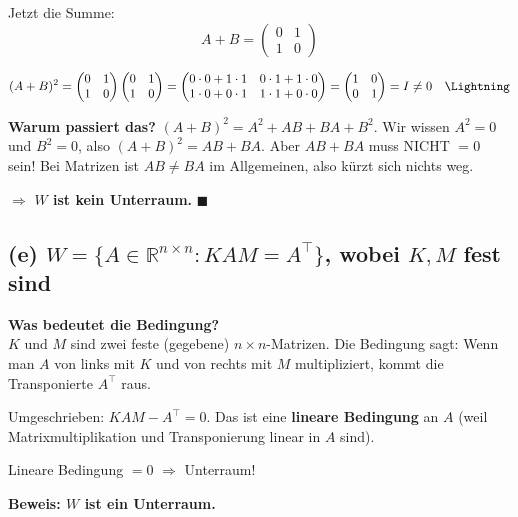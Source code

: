 \documentclass[a4paper,12pt]{article}
\begin{document}
Jetzt die Summe:
\[
A + B = \begin{pmatrix} 0 & 1 \\ 1 & 0 \end{pmatrix}
\]

\[
(A + B)^2 = \begin{pmatrix} 0 & 1 \\ 1 & 0 \end{pmatrix} \begin{pmatrix} 0 & 1 \\ 1 & 0 \end{pmatrix} = \begin{pmatrix} 0 \cdot 0 + 1 \cdot 1 & 0 \cdot 1 + 1 \cdot 0 \\ 1 \cdot 0 + 0 \cdot 1 & 1 \cdot 1 + 0 \cdot 0 \end{pmatrix} = \begin{pmatrix} 1 & 0 \\ 0 & 1 \end{pmatrix} = I \neq 0 \quad \Lightning
\]

\textbf{Warum passiert das?} $(A+B)^2 = A^2 + AB + BA + B^2$. Wir wissen $A^2 = 0$ und $B^2 = 0$, also $(A+B)^2 = AB + BA$. Aber $AB + BA$ muss NICHT $= 0$ sein! Bei Matrizen ist $AB \neq BA$ im Allgemeinen, also k\"urzt sich nichts weg.

$\Rightarrow$ \textbf{$W$ ist kein Unterraum.} \hfill $\blacksquare$

\subsection*{(e) \quad $W = \{A \in \mathbb{R}^{n \times n} : KAM = A^\top\}$, wobei $K, M$ fest sind}

\textbf{Was bedeutet die Bedingung?}\\
$K$ und $M$ sind zwei feste (gegebene) $n \times n$-Matrizen. Die Bedingung sagt: Wenn man $A$ von links mit $K$ und von rechts mit $M$ multipliziert, kommt die Transponierte $A^\top$ raus.

Umgeschrieben: $KAM - A^\top = 0$. Das ist eine \textbf{lineare Bedingung} an $A$ (weil Matrixmultiplikation und Transponierung linear in $A$ sind).

\begin{merkbox}
Lineare Bedingung $= 0$ $\Rightarrow$ Unterraum!
\end{merkbox}

\textbf{Beweis: $W$ ist ein Unterraum.}
\end{document}
